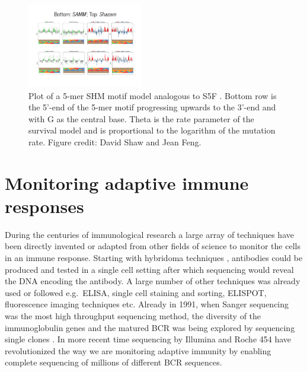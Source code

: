 \begin{figure}[!ht]
    \centering
    \includegraphics[width=0.45\textwidth]{figures/SAMM_plot.pdf}
    \caption{
        \label{fig:SAMM_plot}
        Plot of a 5-mer SHM motif model analogous to S5F \cite{cui2016model}. Bottom row is the 5'-end of the 5-mer motif progressing upwards to the 3'-end and with G as the central base. Theta is the rate parameter of the survival model and is proportional to the logarithm of the mutation rate.
        Figure credit: David Shaw and Jean Feng.
    }
\end{figure}










\section{Monitoring adaptive immune responses}
During the centuries of immunological research a large array of techniques have been directly invented or adapted from other fields of science to monitor the cells in an immune response.
Starting with hybridoma techniques \cite{larrick1989polymemse}, antibodies could be produced and tested in a single cell setting after which sequencing would reveal the DNA encoding the antibody.
A large number of other techniques was already used or followed e.g.\ ELISA, single cell staining and sorting, ELISPOT, fluorescence imaging techniques etc.
Already in 1991, when Sanger sequencing was the most high throughput sequencing method, the diversity of the immunoglobulin genes and the matured BCR was being explored by sequencing single clones \cite{yamada1991preferential}.
In more recent time sequencing by Illumina and Roche 454 have revolutionized the way we are monitoring adaptive immunity by enabling complete sequencing of millions of different BCR sequences.


